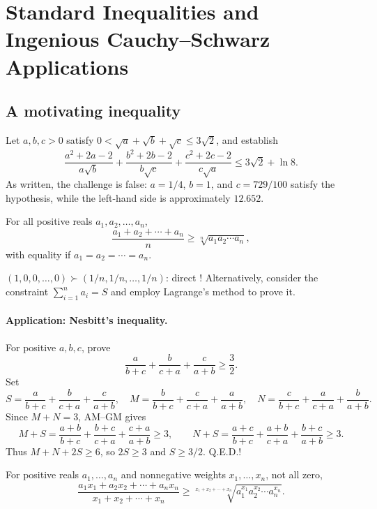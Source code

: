 \documentclass[11pt,a4paper]{article}
\begin{document}
\section*{Standard Inequalities and Ingenious Cauchy–Schwarz Applications}
\subsection{A motivating inequality}
Let $a,b,c>0$ satisfy
$0<\sqrt a+\sqrt b+\sqrt c\leq3\sqrt2$, and establish
\[
\frac{a^2+2a-2}{a\sqrt b}+\frac{b^2+2b-2}{b\sqrt c}
+\frac{c^2+2c-2}{c\sqrt a}\leq3\sqrt2+\ln8.
\]
As written, the challenge is false: $a=1/4$, $b=1$, and $c=729/100$
satisfy the hypothesis, while the left-hand side is approximately $12.652$.

\setcounter{theorem}{70}\begin{lemma}\label{lemma:lb1-74}
For all positive reals $a_1,a_2,\ldots,a_n$,
\[\frac{a_1+a_2+\cdots+a_n}{n}\geq\sqrt[n]{a_1a_2\cdots a_n},\]
with equality if $a_1=a_2=\cdots=a_n$.
\end{lemma}
$(1,0,0,\ldots,0)\succ(1/n,1/n,\ldots,1/n)$: direct !
Alternatively, consider the constraint $\sum_{i=1}^n a_i=S$ and employ Lagrange's method to prove it.
\paragraph{Application: Nesbitt's inequality.}
For positive $a,b,c$, prove
\[\frac a{b+c}+\frac b{c+a}+\frac c{a+b}\geq\frac32.\]
Set
\[
S=\frac a{b+c}+\frac b{c+a}+\frac c{a+b},\quad
M=\frac b{b+c}+\frac c{c+a}+\frac a{a+b},\quad
N=\frac c{b+c}+\frac a{c+a}+\frac b{a+b}.
\]
Since $M+N=3$, AM--GM gives
\[
M+S=\frac{a+b}{b+c}+\frac{b+c}{c+a}+\frac{c+a}{a+b}\geq3,\qquad
N+S=\frac{a+c}{b+c}+\frac{a+b}{c+a}+\frac{b+c}{a+b}\geq3.
\]
Thus $M+N+2S\geq6$, so $2S\geq3$ and $S\geq3/2$. Q.E.D.!
\setcounter{theorem}{71}\begin{lemma}\label{lemma:lb1-75}
For positive reals $a_1,\ldots,a_n$ and nonnegative weights $x_1,\ldots,x_n$, not all zero,
\[\frac{a_1x_1+a_2x_2+\cdots+a_nx_n}{x_1+x_2+\cdots+x_n}
\geq\sqrt[x_1+x_2+\cdots+x_n]{a_1^{x_1}a_2^{x_2}\cdots a_n^{x_n}}.\]
\end{lemma}
\end{document}
